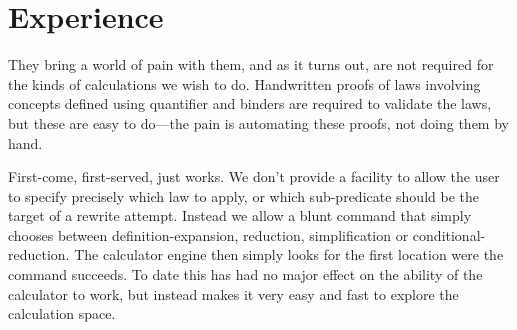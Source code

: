 \section{Experience}\label{sec:Experience}


They bring a world of pain with them,
    and as it turns out, are not required
    for the kinds of calculations we wish to do.
    Handwritten proofs of laws involving concepts
    defined using quantifier and binders
    are required to validate the laws,
    but these are easy to do---the pain is automating these proofs,
    not doing them by hand.

First-come, first-served, just works.
We don't provide a facility
to allow the user to specify
precisely which law to apply,
or which sub-predicate should be the target of a rewrite attempt.
Instead we allow a blunt command that simply chooses between
definition-expansion, reduction, simplification or conditional-reduction.
The calculator engine then simply looks for the first location
were the command succeeds.
To date this has had no major effect on the ability of the calculator
to work, but instead makes it very easy and fast to explore the calculation space.
